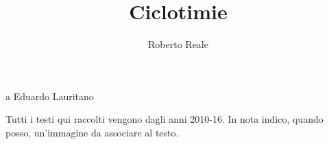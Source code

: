 \documentclass[paper=7.5in:9.25in,pagesize=pdftex,
	               headinclude=on,footinclude=on,11pt]{scrbook}
\title{Ciclotimie}
\author{Roberto Reale}
\begin{document}
\maketitle

a Eduardo Lauritano

\clearpage

Tutti i testi qui raccolti vengono dagli anni 2010-16. In nota indico, quando posso, un'immagine da associare al testo.













\end{document}
